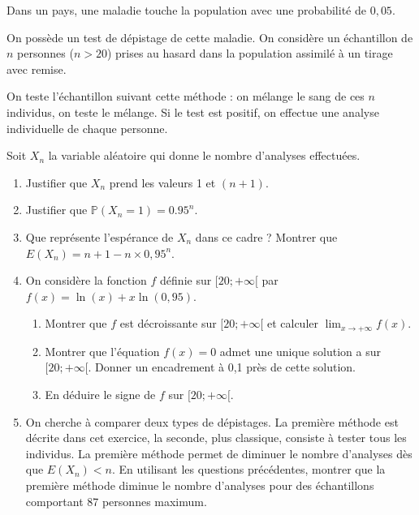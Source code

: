 \documentclass[11pt,fleqn, openany]{book} %
\begin{document}
 
 

\begin{exercise}[topic=log04, subtitle={(Centres étrangers 2021)}]Dans un pays, une maladie touche la population avec une probabilité de $0,05$.

On possède un test de dépistage de cette maladie. On considère un échantillon de $n$ personnes ($n>20$) prises au hasard dans la population assimilé à un tirage avec remise.

On teste l'échantillon suivant cette méthode : on mélange le sang de ces $n$ individus, on teste le mélange. Si le test est positif, on effectue une analyse individuelle de chaque personne.

Soit $X_n$ la variable aléatoire qui donne le nombre d'analyses effectuées.
\begin{enumerate}
\item Justifier que $X_n$ prend les valeurs 1 et $(n +1)$.
\item Justifier que $\mathbb{P}(X_n=1)=0.95^n$.
\item Que représente l'espérance de $X_n$ dans ce cadre ? Montrer que $E(X_n)=n+1-n \times 0,95^n$.

\item On considère la fonction $f$ définie sur $[20 ; +\infty[$ par $f (x) = \ln(x)+ x \ln(0,95)$.
\begin{enumerate}
\item Montrer que $f$ est décroissante sur $[20 ; +\infty[$ et calculer $\displaystyle\lim_{x \to + \infty}f(x)$.
\item Montrer que l'équation  $f (x) = 0$ admet une unique solution a sur $[20 ; +\infty[$.
Donner un encadrement à 0,1 près de cette solution.
\item En déduire le signe de $f$ sur $[20 ; +\infty[$. \end{enumerate}
\item On cherche à comparer deux types de dépistages.
La première méthode est décrite dans cet exercice, la seconde, plus classique, consiste à tester tous les individus.
La première méthode permet de diminuer le nombre d'analyses dès que $E (X_n) < n$.
En utilisant les questions précédentes, montrer que la première méthode diminue le nombre d'analyses pour des échantillons comportant 87 personnes maximum.\end{enumerate}\end{exercise}
\end{document}
